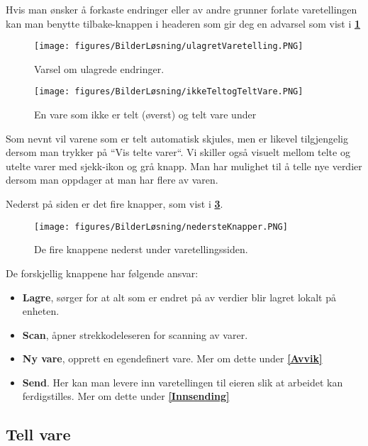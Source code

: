 Hvis man ønsker å forkaste endringer eller av andre grunner forlate varetellingen kan man benytte tilbake-knappen i headeren som gir deg en advarsel som vist i \textbf{\ref{Ulagrede_endringer}}

\begin{figure}[H] 
    \centering
    \texttt{[image: figures/BilderLøsning/ulagretVaretelling.PNG]}
    \caption{Varsel om ulagrede endringer.}
    \label{Ulagrede_endringer}
\end{figure}


\begin{figure}[H] 
    \centering
    \texttt{[image: figures/BilderLøsning/ikkeTeltogTeltVare.PNG]}
    \caption{En vare som ikke er telt (øverst) og telt vare under}
    \label{IkkeTeltOgTeltVare}
\end{figure}

Som nevnt vil varene som er telt automatisk skjules, men er likevel tilgjengelig dersom man trykker på ``Vis telte varer``. Vi skiller også visuelt mellom telte og utelte varer med sjekk-ikon og grå knapp. Man har mulighet til å telle nye verdier dersom man oppdager at man har flere av varen.

Nederst på siden er det fire knapper, som vist i \textbf{\ref{Knapper_VT}}.

\begin{figure}[H] 
    \centering
    \texttt{[image: figures/BilderLøsning/nedersteKnapper.PNG]}
    \caption{De fire knappene nederst under varetellingssiden.}
    \label{Knapper_VT}
\end{figure}

De forskjellig knappene har følgende ansvar:

\begin{itemize}
    \item \textbf{Lagre}, sørger for at alt som er endret på av verdier blir lagret lokalt på enheten.
    \item \textbf{Scan}, åpner strekkodeleseren for scanning av varer.
    \item \textbf{Ny vare}, opprett en egendefinert vare. Mer om dette under \textbf{\ref{Avvik}}
    \item \textbf{Send}. Her kan man levere inn varetellingen til eieren slik at arbeidet kan ferdigstilles. Mer om dette under \textbf{\ref{Innsending}}
\end{itemize}

\subsection{\textbf{Tell vare}} 

